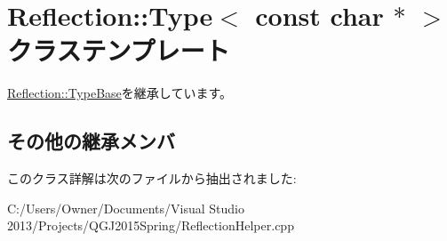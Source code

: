 \hypertarget{class_reflection_1_1_type_3_01const_01char_01_5_01_4}{}\section{Reflection\+:\+:Type$<$ const char $\ast$ $>$ クラステンプレート}
\label{class_reflection_1_1_type_3_01const_01char_01_5_01_4}


\hyperlink{class_reflection_1_1_type_base}{Reflection\+::\+Type\+Base}を継承しています。

\subsection*{その他の継承メンバ}


このクラス詳解は次のファイルから抽出されました\+:\begin{DoxyCompactItemize}
\item 
C\+:/\+Users/\+Owner/\+Documents/\+Visual Studio 2013/\+Projects/\+Q\+G\+J2015\+Spring/Reflection\+Helper.\+cpp\end{DoxyCompactItemize}
